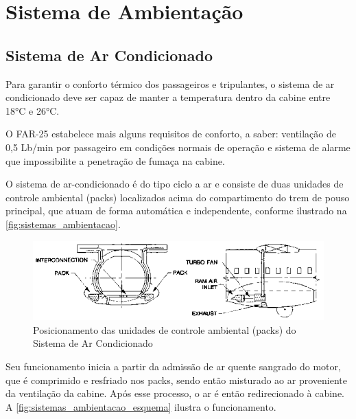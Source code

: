 \section{Sistema de Ambientação}

\subsection{Sistema de Ar Condicionado}

Para garantir o conforto térmico dos passageiros e tripulantes, o sistema de ar condicionado deve ser capaz de manter a temperatura dentro da cabine entre 18°C e 26°C.

O FAR-25 estabelece mais alguns requisitos de conforto, a saber: ventilação de 0,5 Lb/min por passageiro em condições normais de operação e sistema de alarme que impossibilite a penetração de fumaça na cabine.

O sistema de ar-condicionado é do tipo ciclo a ar e consiste de duas unidades de controle ambiental (packs) localizados acima do compartimento do trem de pouso principal, que atuam de forma automática e independente, conforme ilustrado na \autoref{fig:sistemas_ambientacao}.

\begin{figure}
\centering
\includegraphics[width=\textwidth]{images/parte3/sistemas_ambientacao.png}
\caption{Posicionamento das unidades de controle ambiental (packs) do Sistema de Ar Condicionado}
\label{fig:sistemas_ambientacao}
\end{figure}

Seu funcionamento inicia a partir da admissão de ar quente sangrado do motor, que é comprimido e resfriado nos packs, sendo então misturado ao ar proveniente da ventilação da cabine.
Após esse processo, o ar é então redirecionado à cabine.
A \autoref{fig:sistemas_ambientacao_esquema} ilustra o funcionamento.

